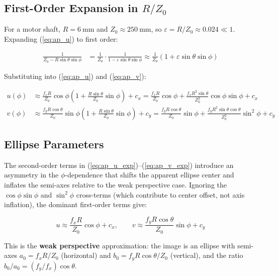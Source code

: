 \documentclass[journal]{IEEEtran}
\begin{document}
\subsection*{First-Order Expansion in $R/Z_0$}

For a motor shaft, $R = 6~\text{mm}$ and $Z_0 \approx 250~\text{mm}$, so
$\varepsilon = R/Z_0 \approx 0.024 \ll 1$. Expanding (\ref{eq:ap_u}) to
first order:

\begin{align}
\frac{1}{Z_0 - R \sin\theta \sin\phi}
    &= \frac{1}{Z_0} \cdot \frac{1}{1 - \varepsilon \sin\theta \sin\phi}
    \approx \frac{1}{Z_0}\left(1 + \varepsilon \sin\theta \sin\phi\right)
    \label{eq:ap_expand}
\end{align}

Substituting into (\ref{eq:ap_u}) and (\ref{eq:ap_v}):

\begin{align}
u(\phi) &\approx \frac{f_x R}{Z_0} \cos\phi
           \left(1 + \frac{R \sin\theta}{Z_0} \sin\phi\right) + c_x
        = \frac{f_x R}{Z_0} \cos\phi
          + \frac{f_x R^2 \sin\theta}{Z_0^2} \cos\phi \sin\phi + c_x
        \label{eq:ap_u_exp} \\
v(\phi) &\approx \frac{f_y R \cos\theta}{Z_0} \sin\phi
           \left(1 + \frac{R \sin\theta}{Z_0} \sin\phi\right) + c_y
        = \frac{f_y R \cos\theta}{Z_0} \sin\phi
          + \frac{f_y R^2 \sin\theta \cos\theta}{Z_0^2} \sin^2\phi + c_y
        \label{eq:ap_v_exp}
\end{align}

\subsection*{Ellipse Parameters}

The second-order terms in (\ref{eq:ap_u_exp})--(\ref{eq:ap_v_exp}) introduce
an asymmetry in the $\phi$-dependence that shifts the apparent ellipse center
and inflates the semi-axes relative to the weak perspective case. Ignoring
the $\cos\phi\sin\phi$ and $\sin^2\phi$ cross-terms (which contribute to
center offset, not axis inflation), the dominant first-order terms give:

\begin{equation}
u \approx \frac{f_x R}{Z_0} \cos\phi + c_x, \qquad
v \approx \frac{f_y R \cos\theta}{Z_0} \sin\phi + c_y
\label{eq:ap_weak}
\end{equation}

This is the \textbf{weak perspective} approximation: the image is an ellipse
with semi-axes $a_0 = f_x R / Z_0$ (horizontal) and $b_0 = f_y R \cos\theta / Z_0$
(vertical), and the ratio $b_0/a_0 = (f_y/f_x) \cos\theta$.
\end{document}

